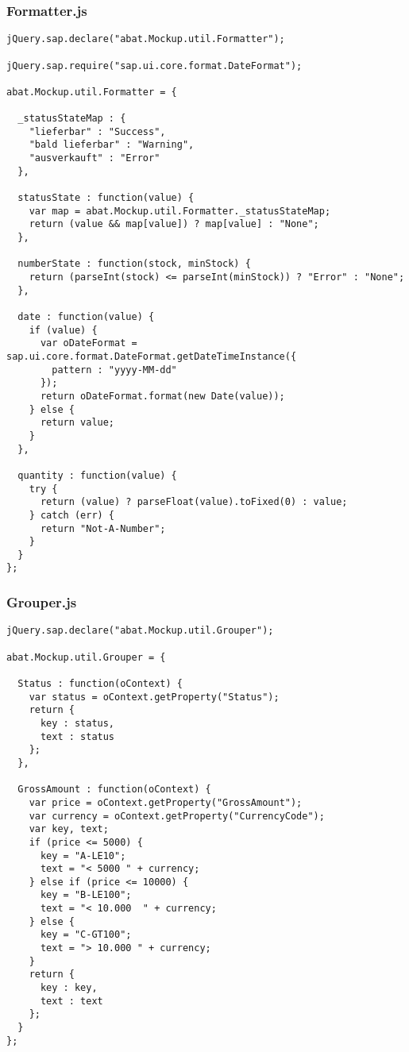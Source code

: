 \newpage
\subsubsection*{Formatter.js}
\begin{lstlisting}[frame=htrbl, label=lst:Formatter.js]
jQuery.sap.declare("abat.Mockup.util.Formatter");

jQuery.sap.require("sap.ui.core.format.DateFormat");

abat.Mockup.util.Formatter = {

  _statusStateMap : {
    "lieferbar" : "Success",
    "bald lieferbar" : "Warning",
    "ausverkauft" : "Error"
  },

  statusState : function(value) {
    var map = abat.Mockup.util.Formatter._statusStateMap;
    return (value && map[value]) ? map[value] : "None";
  },

  numberState : function(stock, minStock) {
    return (parseInt(stock) <= parseInt(minStock)) ? "Error" : "None";
  },

  date : function(value) {
    if (value) {
      var oDateFormat = sap.ui.core.format.DateFormat.getDateTimeInstance({
        pattern : "yyyy-MM-dd"
      });
      return oDateFormat.format(new Date(value));
    } else {
      return value;
    }
  },

  quantity : function(value) {
    try {
      return (value) ? parseFloat(value).toFixed(0) : value;
    } catch (err) {
      return "Not-A-Number";
    }
  }
};
\end{lstlisting}

\newpage
\subsubsection*{Grouper.js}
\begin{lstlisting}[frame=htrbl, label=lst:Grouper.js]
jQuery.sap.declare("abat.Mockup.util.Grouper");

abat.Mockup.util.Grouper = {

  Status : function(oContext) {
    var status = oContext.getProperty("Status");
    return {
      key : status,
      text : status
    };
  },

  GrossAmount : function(oContext) {
    var price = oContext.getProperty("GrossAmount");
    var currency = oContext.getProperty("CurrencyCode");
    var key, text;
    if (price <= 5000) {
      key = "A-LE10";
      text = "< 5000 " + currency;
    } else if (price <= 10000) {
      key = "B-LE100";
      text = "< 10.000  " + currency;
    } else {
      key = "C-GT100";
      text = "> 10.000 " + currency;
    }
    return {
      key : key,
      text : text
    };
  }
};
\end{lstlisting}

